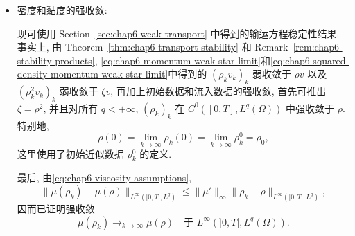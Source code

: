 \begin{sloppypar}
\begin{itemize}
 利用\eqref{eq:chap6-uniform-energy-bound}, 可找到另一个仍记为 $(v_k)_k$ 的子列和
 $v\in v_b+L^2(]0,T[,V)$, 使
 \begin{equation}
  v_k\rightharpoonup_{k\to\infty}v
  \quad\text{弱于 }L^2(]0,T[,(H^1(\Omega))^d).
 \label{eq:chap6-velocity-weak-limit}
 \end{equation}
 乘积映射 $(\rho,v)\mapsto\rho v$ 从 $W^{-1,6}(\Omega)\times(H^1(\Omega))^d$ 连续映入 $(W^{-1,3}(\Omega))^d$ (Theorem~\ref{thm:chap3-sobolev-product}). 利用 Proposition~\ref{prop:chap2-strong-weak-bilinear} 和上面为 $(\rho_k)_k$ 与 $(\rho_k^2)_k$ 证明的强收敛性, 得
 \[
  \rho_kv_k\rightharpoonup_{k\to\infty}\rho v
  \quad\text{弱于 }L^2(]0,T[,(W^{-1,3}(\Omega))^d),
 \]
 \[
  \rho_k^2v_k\rightharpoonup_{k\to\infty}\zeta v
  \quad\text{弱于 }L^2(]0,T[,(W^{-1,3}(\Omega))^d).
 \]
 此外, 由\eqref{eq:chap6-uniform-energy-bound}可知, $(\rho_kv_k)_k$ 和 $(\rho_k^2v_k)_k$ 在 $L^\infty(]0,T[,(L^2(\Omega))^d)$ 中有界. 因此使用 Proposition~\ref{prop:chap2-small-space-weak-convergence} (弱-* 收敛序列这一略有不同的情形见 Remark~\ref{rem:chap2-small-space-weak-star}), 得
 \begin{equation}
  \rho_kv_k\xrightharpoonup[k\to\infty]{*}\rho v
  \quad\text{弱-* 于 }L^\infty(]0,T[,(L^2(\Omega))^d),
 \label{eq:chap6-momentum-weak-star-limit}
 \end{equation}
 \begin{equation}
  \rho_k^2v_k\xrightharpoonup[k\to\infty]{*}\zeta v
  \quad\text{弱-* 于 }L^\infty(]0,T[,(L^2(\Omega))^d).
 \label{eq:chap6-squared-density-momentum-weak-star-limit}
 \end{equation}

 \item 密度和黏度的强收敛:

 现可使用 Section~\ref{sec:chap6-weak-transport} 中得到的输运方程稳定性结果. 事实上, 由 Theorem~\ref{thm:chap6-transport-stability} 和 Remark~\ref{rem:chap6-stability-products}, \eqref{eq:chap6-momentum-weak-star-limit}和\eqref{eq:chap6-squared-density-momentum-weak-star-limit}中得到的 $(\rho_kv_k)_k$ 弱收敛于 $\rho v$ 以及 $(\rho_k^2v_k)_k$ 弱收敛于 $\zeta v$, 再加上初始数据和流入数据的强收敛, 首先可推出 $\zeta=\rho^2$, 并且对所有 $q<+\infty$, $(\rho_k)_k$ 在 $C^0([0,T],L^q(\Omega))$ 中强收敛于 $\rho$. 特别地,
 \[
  \rho(0)=\lim_{k\to\infty}\rho_k(0)
  =\lim_{k\to\infty}\rho_k^0=\rho_0,
 \]
这里使用了初始近似数据 $\rho_k^0$ 的定义.

最后, 由\eqref{eq:chap6-viscosity-assumptions},
 \[
  \|\mu(\rho_k)-\mu(\rho)\|_{L^\infty(]0,T[,L^q)}
  \leq\|\mu'\|_\infty
  \|\rho_k-\rho\|_{L^\infty(]0,T[,L^q)},
 \]
因而已证明强收敛
 \begin{equation}
  \mu(\rho_k)\longrightarrow_{k\to\infty}\mu(\rho)
  \quad\text{于 }L^\infty(]0,T[,L^q(\Omega)).
 \label{eq:chap6-viscosity-strong-limit}
 \end{equation}


\end{itemize}
\end{sloppypar}
